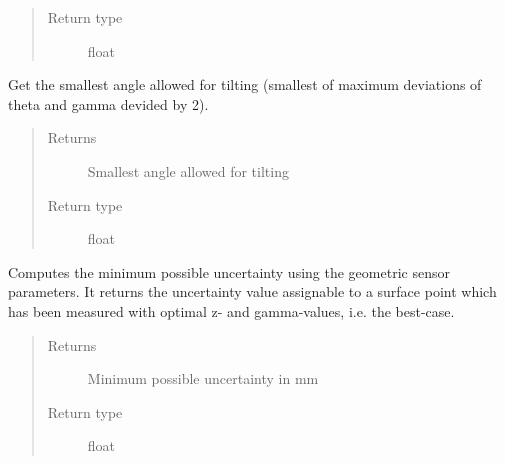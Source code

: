 \documentclass[letterpaper,10pt,english]{sphinxmanual}
\begin{document}
\begin{fulllineitems}
\begin{fulllineitems}
\begin{quote}
\begin{description}
\item[{Return type}] \leavevmode
float

\end{description}\end{quote}

\end{fulllineitems}


\begin{fulllineitems}
\label{\detokenize{module_sensor_model:agiprobot_measurement.sensor_model.SensorModel.get_median_deviation_angle}}
Get the smallest angle allowed for tilting (smallest of maximum deviations of theta and gamma devided by 2).
\begin{quote}\begin{description}
\item[{Returns}] \leavevmode
Smallest angle allowed for tilting

\item[{Return type}] \leavevmode
float

\end{description}\end{quote}

\end{fulllineitems}


\begin{fulllineitems}
\label{\detokenize{module_sensor_model:agiprobot_measurement.sensor_model.SensorModel.get_min_uncertainty}}
Computes the minimum possible uncertainty using the geometric sensor parameters. It returns the uncertainty value assignable to
a surface point which has been measured with optimal z- and gamma-values, i.e. the best-case.
\begin{quote}\begin{description}
\item[{Returns}] \leavevmode
Minimum possible uncertainty in mm

\item[{Return type}] \leavevmode
float

\end{description}\end{quote}


\end{fulllineitems}
\end{fulllineitems}
\end{document}
